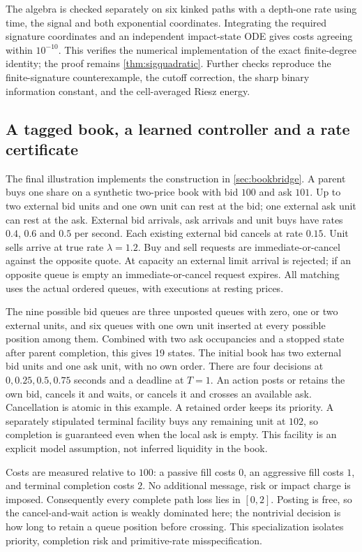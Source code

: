 \documentclass[11pt]{article}
\numberwithin{equation}{section}
\theoremstyle{definition}
\theoremstyle{remark}
\theoremstyle{definition}
\begin{document}
The algebra is checked separately on six kinked paths with a depth-one rate
using time, the signal and both exponential coordinates. Integrating the
required signature coordinates and an independent impact-state ODE gives
costs agreeing within $10^{-10}$. This verifies the numerical implementation
of the exact finite-degree identity; the proof remains
\cref{thm:sigquadratic}. Further checks reproduce the finite-signature
counterexample, the cutoff correction, the sharp binary information constant,
and the cell-averaged Riesz energy.

\subsection{A tagged book, a learned controller and a rate certificate}\label{sec:bookexperiment}

The final illustration implements the construction in \cref{sec:bookbridge}.
A parent buys one share on a synthetic two-price book with bid $100$ and ask
$101$. Up to two external bid units and one own unit can rest at the bid;
one external ask unit can rest at the ask. External bid arrivals, ask
arrivals and unit buys have rates $0.4$, $0.6$ and $0.5$ per second. Each
existing external bid cancels at rate $0.15$. Unit sells arrive at true rate
$\lambda=1.2$. Buy and sell requests are immediate-or-cancel against the
opposite quote. At capacity an external limit arrival is rejected; if an
opposite queue is empty an immediate-or-cancel request expires. All matching
uses the actual ordered queues, with executions at resting prices.

The nine possible bid queues are three unposted queues with zero, one or two
external units, and six queues with one own unit inserted at every possible
position among them. Combined with two ask occupancies and a stopped state
after parent completion, this gives 19 states. The initial book has two
external bid units and one ask unit, with no own order. There are four
decisions at $0,0.25,0.5,0.75$ seconds and a deadline at $T=1$. An action
posts or retains the own bid, cancels it and waits, or cancels it and crosses
an available ask. Cancellation is atomic in this example. A retained order
keeps its priority. A separately stipulated terminal facility buys any
remaining unit at $102$, so completion is guaranteed even when the local
ask is empty. This facility is an explicit model assumption, not inferred
liquidity in the book.

Costs are measured relative to $100$: a passive fill costs $0$, an aggressive
fill costs $1$, and terminal completion costs $2$. No additional message,
risk or impact charge is imposed. Consequently every complete path loss
lies in $[0,2]$. Posting is free, so the cancel-and-wait action is weakly
dominated here; the nontrivial decision is how long to retain a queue
position before crossing. This specialization isolates priority, completion
risk and primitive-rate misspecification.
\end{document}
